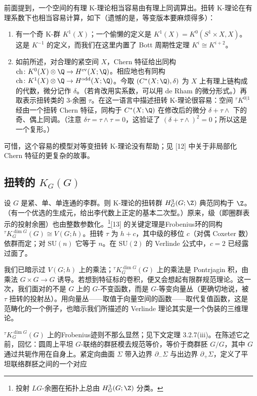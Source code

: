 \begin{remark}
前面提到，一个空间的有理 K-理论相当容易由有理上同调算出。扭转 K-理论在有理系数下也相当容易计算，如下（遗憾的是，等变版本要麻烦得多）：
\begin{enumerate}[label=(\roman*),leftmargin=2.6em,itemsep=2pt]
\item 有一个奇 K-群 $K^1(X)$；一个偷懒的定义是 $K^1(X)=K^0(S^1\times X,X)$。这是 $K^{-1}$ 的定义，而我们在这里内置了 Bott 周期性定理 $K^i\cong K^{i+2}$。
\item 如前所述，对合理的紧空间 $X$，Chern 特征给出同构 $\operatorname{ch}\colon K^0(X)\otimes\Q\to H^{\mathrm{ev}}(X;\Q)$。相应地也有同构 $\operatorname{ch}\colon K^1(X)\otimes\Q\to H^{\mathrm{odd}}(X;\Q)$。今取 $(C^*(X;\Q),\delta)$ 为 $X$ 上有理上链构成的代数，微分记作 $\delta$。（若肯改用实系数，可以用 de Rham 的微分形式。）再取表示扭转类的 $3$-余圈 $\tau$。在这一语言中描述扭转 K-理论很容易：空间 ${}^\tau K^{0|1}$ 经由一个扭转 Chern 特征，同构于 $C^*(X;\Q)$ 在修改后的微分 $\delta+\tau\wedge$ 下的奇、偶上同调。（注意 $\delta\tau=\tau\wedge\tau=0$，这验证了 $(\delta+\tau\wedge)^2=0$；所以这是一个复形。）
\end{enumerate}
可惜，这个容易的模型对等变扭转 K-理论没有帮助；见 [12] 中关于非局部化 Chern 特征的更复杂的故事。
\end{remark}

\subsection{扭转的 $K_G(G)$}

设 $G$ 是紧、单、单连通的李群。则 K-理论的扭转群 $H^3_G(G;\Z)$ 典范同构于 $\Z$。（有一个优选的生成元，给出李代数上正定的基本二次型。）原来，级（即圈群表示的投射余圈）也由整数参数化。\footnote{投射 $LG$-余圈在拓扑上总由 $H^3_G(G;\Z)$ 分类。}[13] 的关键定理是Frobenius环的同构 ${}^\tau K^{\dim G}_G(G)\cong V(G;h)$。扭转 $\tau$ 为 $h+c$，其中级的移位 $c$（对偶 Coxeter 数）依群而定；对 $\mathrm{SU}(n)$ 它等于 $n$。在 $\mathrm{SU}(2)$ 的 Verlinde 公式中，$c=2$ 已经露过面了。

我们已暗示过 $V(G;h)$ 上的乘法；${}^\tau K^{\dim G}_G(G)$ 上的乘法是 Pontrjagin 积，由乘法 $G\times G\to G$ 诱导。若想到特征标的卷积，便又会想起有限群规范理论。这一次，我们面对的不是 $G$ 上的 $G$-不变函数，而是 $G$-等变向量丛（更确切地说，被 $\tau$ 扭转的投射丛）。用向量丛——取值于向量空间的函数——取代复值函数，这是范畴化的一个例子，也暗示我们所描述的 Verlinde 理论其实是一个伪装的三维理论。

${}^\tau K^{\dim G}_G(G)$ 上的Frobenius迹则不那么显然；见下文定理 3.2.7(iii)。在陈述它之前，回忆：圆周上平坦 $G$-联络的群胚模去规范等价，等价于商群胚 $G/G$，其中 $G$ 通过共轭作用在自身上。紧定向曲面 $\Sigma$ 带入边界 $\partial_-\Sigma$ 与出边界 $\partial_+\Sigma$，定义了平坦联络群胚之间的一个对应
\begin{center}
\end{center}

